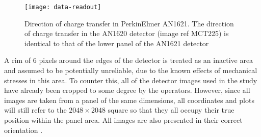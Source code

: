 \documentclass[\main/IO-Pixels.tex]{subfiles}
\begin{document}
\begin{figure}[!ht]
\caption{ Direction of charge transfer in PerkinElmer AN1621. The direction of charge transfer in the AN1620 detector (image ref MCT225) is identical to that of the lower panel of the AN1621 detector }
\label{fig:charge-transfer-direction}
\texttt{[image: data-readout]}
\end{figure} 


A rim of 6 pixels around the edges of the detector is treated as an inactive area and assumed to be potentially unreliable, due to the known effects of mechanical stresses in this area. To counter this, all of the detector images used in the study have already been cropped to some degree by the operators.  However, since all images are taken from a panel of the same dimensions, all coordinates and plots will still refer to the $2048 \times 2048$ square so that they all occupy their true position within the panel area. All images are also presented in their correct orientation .
  
\end{document}
